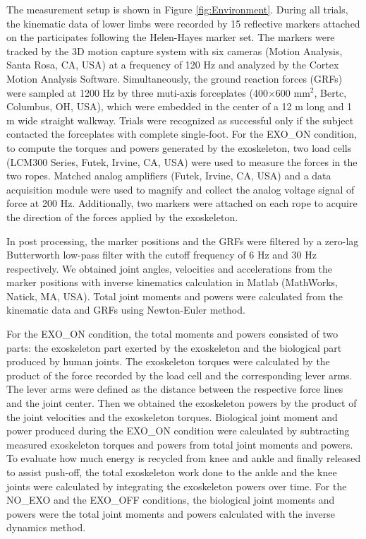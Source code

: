 \documentclass[twocolumn,cleanfoot,10pt]{asme2ej}
\begin{document}
The measurement setup is shown in Figure \ref{fig:Environment}. During all trials, the kinematic data of lower limbs were recorded by 15 reflective markers attached on the participates following the Helen-Hayes marker set\cite{RN24}. The markers were tracked by the 3D motion capture system with six cameras (Motion Analysis, Santa Rosa, CA, USA) at a frequency of 120 Hz and analyzed by the Cortex Motion Analysis Software. Simultaneously, the ground reaction forces (GRFs) were sampled at 1200 Hz by three muti-axis forceplates (400$\times$600 mm$^{2}$, Bertc, Columbus, OH, USA), which were embedded in the center of a 12 m long and 1 m wide straight walkway. Trials were recognized as successful only if the subject contacted the forceplates with complete single-foot. For the EXO\_ON condition, to compute the torques and powers generated by the exoskeleton, two load cells (LCM300 Series, Futek, Irvine, CA, USA) were used to measure the forces in the two ropes. Matched analog amplifiers (Futek, Irvine, CA, USA) and a data acquisition module were used to magnify and collect the analog voltage signal of force at 200 Hz. Additionally, two markers were attached on each rope to acquire the direction of the forces applied by the exoskeleton.

In post processing, the marker positions and the GRFs were filtered by a zero-lag Butterworth low-pass filter with the cutoff frequency of 6 Hz and 30 Hz respectively. We obtained joint angles, velocities and accelerations from the marker positions with inverse kinematics calculation in Matlab (MathWorks, Natick, MA, USA). Total joint moments and powers were calculated from the kinematic data and GRFs using Newton-Euler method. 

For the EXO\_ON condition, the total moments and powers consisted of two parts: the exoskeleton part exerted by the exoskeleton and the biological part produced by human joints. The exoskeleton torques were calculated by the product of the force recorded by the load cell and the corresponding lever arms. The lever arms were defined as the distance between the respective force lines and the joint center. Then we obtained the exoskeleton powers by the product of the joint velocities and the exoskeleton torques. Biological joint moment and power produced during the EXO\_ON condition were calculated by subtracting measured exoskeleton torques and powers from total joint moments and powers. To evaluate how much energy is recycled from knee and ankle and finally released to assist push-off, the total exoskeleton work done to the ankle and the knee joints were calculated by integrating the exoskeleton powers over time. For the NO\_EXO and the EXO\_OFF conditions, the biological joint moments and powers were the total joint moments and powers calculated with the inverse dynamics method.
\end{document}
